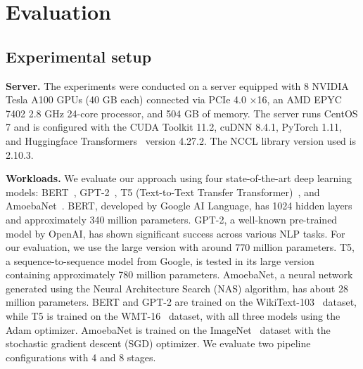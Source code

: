\section{Evaluation}
\label{sec:evaluation}
\subsection{Experimental setup}
\textbf{Server.}
The experiments were conducted on a server equipped with
8 NVIDIA Tesla A100 GPUs (40 GB each) connected via PCIe 4.0 ×16,
an AMD EPYC 7402 2.8 GHz 24-core processor, and 504 GB of memory.
The server runs CentOS 7 and is configured with the CUDA Toolkit 11.2, cuDNN 8.4.1, PyTorch 1.11,
and Huggingface Transformers~\cite{wolf2020transformers} version 4.27.2. The NCCL library version used is 2.10.3.

\textbf{Workloads.} We evaluate our approach using four state-of-the-art deep learning models:
BERT~\cite{devlinBERTPretrainingDeep2019}, GPT-2~\cite{radfordLanguageModelsAre2019},
T5 (Text-to-Text Transfer Transformer)~\cite{raffelExploringLimitsTransfer2020}, and AmoebaNet~\cite{realRegularizedEvolutionImage2019}.
BERT, developed by Google AI Language, has 1024 hidden layers and approximately 340 million parameters.
GPT-2, a well-known pre-trained model by OpenAI, has shown significant success across various NLP tasks.
For our evaluation, we use the large version with around 770 million parameters.
T5, a sequence-to-sequence model from Google,
is tested in its large version containing approximately 780 million parameters.
AmoebaNet, a neural network generated using the Neural Architecture Search (NAS) algorithm, has about 28 million parameters.
BERT and GPT-2 are trained on the WikiText-103~\cite{merityPointerSentinelMixture2017} dataset,
while T5 is trained on the WMT-16~\cite{bojarFindings2016Conference2016} dataset, with all three models using the Adam optimizer.
AmoebaNet is trained on the ImageNet~\cite{dengImagenetLargeScaleHierarchical2009}
dataset with the stochastic gradient descent (SGD) optimizer.
We evaluate two pipeline configurations with 4 and 8 stages.

